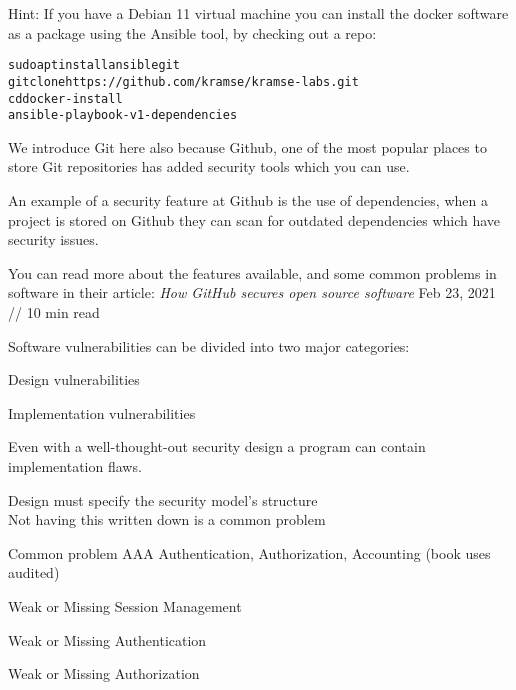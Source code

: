 \documentclass[Screen16to9,17pt]{foils}
\begin{document}
Hint: If you have a Debian 11 virtual machine you can install the docker software as a package using the Ansible tool, by checking out a repo:
\begin{alltt}
sudo apt install ansible git
git clone https://github.com/kramse/kramse-labs.git
cd docker-install
ansible-playbook -v 1-dependencies
\end{alltt}


We introduce Git here also because Github, one of the most popular places to store Git repositories has added security tools which you can use.

An example of a security feature at Github is the use of dependencies, when a project is stored on Github they can scan for outdated dependencies which have security issues.

You can read more about the features available, and some common problems in software in their article:
\emph{How GitHub secures open source software}
Feb 23, 2021 // 10 min read\\






Software vulnerabilities can be divided into two major categories:
\begin{list2}
\item Design vulnerabilities
\item Implementation vulnerabilities
\end{list2}

Even with a well-thought-out security design a program can contain implementation flaws.


\begin{list2}
\item Design must specify the security model's structure\\
Not having this written down is a common problem
\item Common problem AAA Authentication, Authorization, Accounting (book uses audited)
\item Weak or Missing Session Management
\item Weak or Missing Authentication
\item Weak or Missing Authorization
\end{list2}
\end{document}

